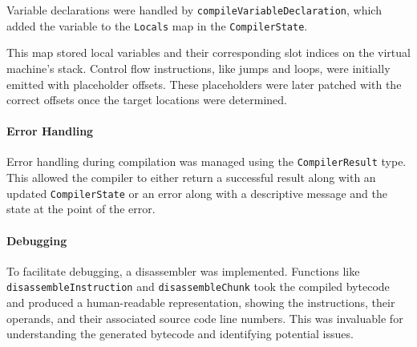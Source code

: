 Variable declarations were handled by \texttt{compileVariableDeclaration}, which added the variable to the \texttt{Locals} map in the \texttt{CompilerState}.

This map stored local variables and their corresponding slot indices on the virtual machine's stack. 
Control flow instructions, like jumps and loops, were initially emitted with placeholder offsets. 
These placeholders were later patched with the correct offsets once the target locations were determined.

\paragraph{Error Handling}
Error handling during compilation was managed using the \texttt{CompilerResult} type. 
This allowed the compiler to either return a successful result along with an updated \texttt{CompilerState} or an error along with a descriptive message and the state at the point of the error.

\paragraph{Debugging}
To facilitate debugging, a disassembler was implemented. 
Functions like \texttt{disassembleInstruction} and \texttt{disassembleChunk} took the compiled bytecode and produced a human-readable representation, showing the instructions, their operands, and their associated source code line numbers. 
This was invaluable for understanding the generated bytecode and identifying potential issues.
